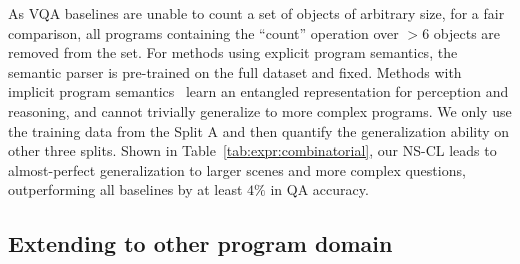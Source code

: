 \documentclass{article} %
\newcommand{\tbl}[1]{Table~\ref{#1}}
\newcommand{\model}{NS-CL\xspace}
\begin{document}
As VQA baselines are unable to count a set of objects of arbitrary size, for a fair comparison, all programs containing the ``count'' operation over $>6$ objects are removed from the set. For methods using explicit program semantics, the semantic parser is pre-trained on the full dataset and fixed. Methods with implicit program semantics~\citep{Hudson2018Compositional} learn an entangled representation for perception and reasoning, and cannot trivially generalize to more complex programs. We only use the training data from the Split A and then quantify the generalization ability on other three splits. Shown in \tbl{tab:expr:combinatorial}, our \model leads to almost-perfect generalization to larger scenes and more complex questions, outperforming all baselines by at least $4\%$ in QA accuracy. %
%


\subsection{Extending to other program domain}
\end{document}
